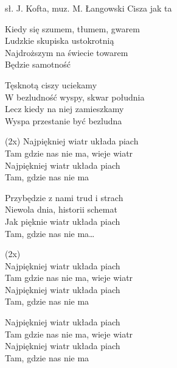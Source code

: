 {sł. J. Kofta, muz. M. Łangowski}
{Cisza jak ta}
\begin{text}
    \hfill\break
Kiedy się szumem, tłumem, gwarem \\
Ludzkie skupiska ustokrotnią \\
Najdroższym na świecie towarem \\
Będzie samotność

    \hfill\break
Tęsknotą ciszy uciekamy \\
W bezludność wyspy, skwar południa \\
Lecz kiedy na niej zamieszkamy \\
Wyspa przestanie być bezludna

\vin (2x)
\vin Najpiękniej wiatr układa piach \\
\vin Tam gdzie nas nie ma, wieje wiatr \\
\vin Najpiękniej wiatr układa piach \\
\vin Tam, gdzie nas nie ma

Przybędzie z nami trud i strach \\
Niewola dnia, historii schemat \\
Jak pięknie wiatr układa piach \\
Tam, gdzie nas nie ma…

\vin (2x)\\
\vin Najpiękniej wiatr układa piach \\
\vin Tam gdzie nas nie ma, wieje wiatr \\
\vin Najpiękniej wiatr układa piach \\
\vin Tam, gdzie nas nie ma

    \hfill\break
\vin Najpiękniej wiatr układa piach \\
\vin Tam gdzie nas nie ma, wieje wiatr \\
\vin Najpiękniej wiatr układa piach \\
\vin Tam, gdzie nas nie ma
\end{text}
